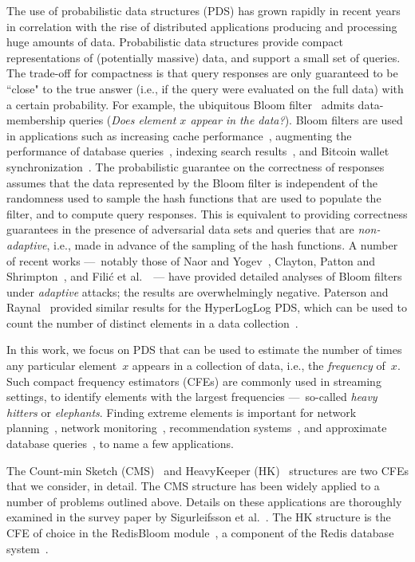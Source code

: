 The use of probabilistic data structures (PDS) has grown rapidly in recent years in correlation with the rise of distributed applications producing and processing huge amounts of data. Probabilistic data structures provide compact representations of (potentially massive) data, and support a small set of queries.  The trade-off for compactness is that query responses are only guaranteed to be ``close" to the true answer (i.e., if the query were evaluated on the full data) with a certain probability. For example, the ubiquitous Bloom filter~\cite{bloom1970space} admits data-membership queries (\emph{Does element $x$ appear in the data?}).  Bloom filters are used in applications such as increasing cache performance~\cite{maggs2015}, augmenting the performance of database queries~\cite{dean2006}, indexing search results~\cite{goodwin2017bitfunnel}, and Bitcoin wallet synchronization~\cite{bip-0037}.
The probabilistic guarantee on the correctness of responses assumes that the data represented by the Bloom filter is independent of the randomness used to sample the hash functions that are used to populate the filter, and to compute query responses.  This is equivalent to providing correctness guarantees in the presence of adversarial data sets and queries that are \emph{non-adaptive}, i.e., made in advance of the sampling of the hash functions.  
A number of recent works ---~notably those of Naor and Yogev~\cite{naor2015bloom}, Clayton, Patton and Shrimpton~\cite{clayton2019}, and Fili\'{c} et al.~\cite{_CCS:FPUV22}~--- have provided detailed analyses of Bloom filters under \emph{adaptive} attacks; the results are overwhelmingly negative. Paterson and Raynal~\cite{paterson2021} provided similar results for the HyperLogLog PDS, which can be used to count the number of distinct elements in a data collection~\cite{flajolet2007hyperloglog}.

In this work, we focus on PDS that can be used to estimate the number of times any particular element~$x$ appears in a collection of data, i.e., the \emph{frequency} of~$x$. Such compact frequency estimators (CFEs) are commonly used in streaming settings, to identify elements with the largest frequencies ---~so-called \emph{heavy hitters} or \emph{elephants}.  Finding extreme elements is important for network planning~\cite{feldman00}, network monitoring~\cite{lakhina04}, recommendation systems~\cite{melis2015efficient}, and approximate database queries~\cite{redisbloom}, to name a few applications.  

The Count-min Sketch (CMS)~\cite{cormode2005improved} and HeavyKeeper (HK)~\cite{yang2019heavykeeper} structures are two CFEs that we consider, in detail.
The CMS structure has been widely applied to a number of problems outlined above. Details on these applications are thoroughly examined in the survey paper by Sigurleifsson et al.~\cite{sigurleifsson2019overview}. 
The HK structure is the CFE of choice in the RedisBloom module~\cite{redisbloom}, a component of the Redis database system~\cite{redis}.  

